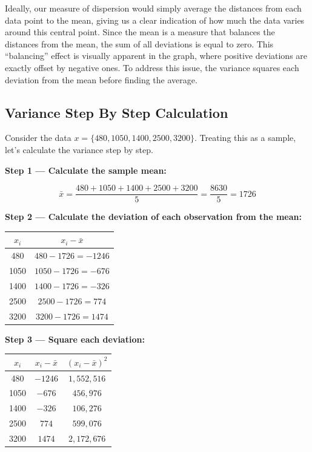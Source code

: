 \documentclass[
  11pt,
  letterpaper,
  DIV=11,
  numbers=noendperiod,
  oneside,
  open=any]{scrreprt}
\begin{document}
Ideally, our measure of dispersion would simply average the distances
from each data point to the mean, giving us a clear indication of how
much the data varies around this central point. Since the mean is a
measure that balances the distances from the mean, the sum of all
deviations is equal to zero. This ``balancing'' effect is visually
apparent in the graph, where positive deviations are exactly offset by
negative ones. To address this issue, the variance squares each
deviation from the mean before finding the average.

\subsection*{Variance Step By Step
Calculation}\label{variance-step-by-step-calculation}

Consider the data \(x=\{480, 1050, 1400, 2500, 3200\}\). Treating this
as a sample, let's calculate the variance step by step.

\textbf{Step 1 --- Calculate the sample mean:}

\[\bar{x} = \frac{480 + 1050 + 1400 + 2500 + 3200}{5} = \frac{8630}{5} = 1726\]

\textbf{Step 2 --- Calculate the deviation of each observation from the
mean:}

\begin{center}
\begin{tabular}{cc}
\toprule
\(x_i\) & \(x_i - \bar{x}\) \\
\midrule
480 & \(480-1726=-1246\) \\
1050 & \(1050-1726=-676\) \\
1400 & \(1400-1726=-326\) \\
2500 & \(2500-1726=774\) \\
3200 & \(3200-1726=1474\) \\
\bottomrule
\end{tabular}
\end{center}

\textbf{Step 3 --- Square each deviation:}

\begin{center}
\begin{tabular}{ccc}
\toprule
\(x_i\) & \(x_i - \bar{x}\) & \((x_i - \bar{x})^2\) \\
\midrule
480 & \(-1246\) & \(1,552,516\) \\
1050 & \(-676\) & \(456,976\) \\
1400 & \(-326\) & \(106,276\) \\
2500 & \(774\) & \(599,076\) \\
3200 & \(1474\) & \(2,172,676\) \\
\bottomrule
\end{tabular}
\end{center}
\end{document}
